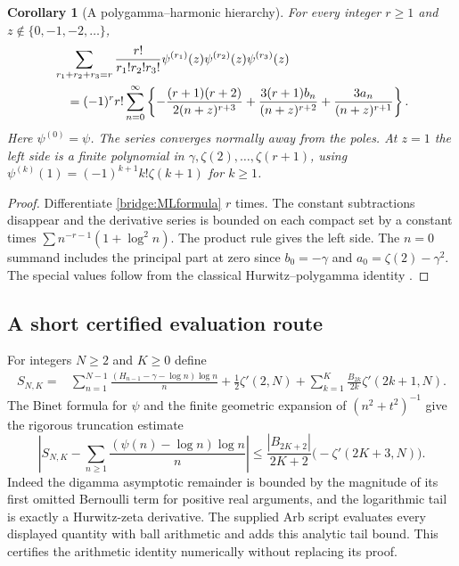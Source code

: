 \documentclass[11pt]{article}
\numberwithin{equation}{section}
\newtheorem{corollary}[theorem]{Corollary}
\theoremstyle{definition}
\theoremstyle{remark}
\begin{document}
\begin{corollary}[A polygamma--harmonic hierarchy]\label{bridge:polygamma}
For every integer $r\ge1$ and $z\notin\{0,-1,-2,\ldots\}$,
\begin{align}
 &\sum_{r_1+r_2+r_3=r}\frac{r!}{r_1!r_2!r_3!}
       \psi^{(r_1)}(z)\psi^{(r_2)}(z)\psi^{(r_3)}(z)\notag\\
 &\quad=(-1)^r r!\sum_{n=0}^{\infty}
   \left\{-\frac{(r+1)(r+2)}{2(n+z)^{r+3}}
       +\frac{3(r+1)b_n}{(n+z)^{r+2}}
       +\frac{3a_n}{(n+z)^{r+1}}\right\}.
 \label{bridge:allpolygamma}
\end{align}
Here $\psi^{(0)}=\psi$. The series converges normally away from
the poles. At $z=1$ the left side is a finite polynomial in
$\gamma,\zeta(2),\ldots,\zeta(r+1)$, using
$\psi^{(k)}(1)=(-1)^{k+1}k!\zeta(k+1)$ for $k\ge1$.
\end{corollary}
\begin{proof}
Differentiate \eqref{bridge:MLformula} $r$ times. The constant
subtractions disappear and the derivative series is bounded on each
compact set by a constant times
$\sum n^{-r-1}(1+\log^2n)$. The product rule gives the left
side. The $n=0$ summand includes the principal part at zero since
$b_0=-\gamma$ and $a_0=\zeta(2)-\gamma^2$. The special values
follow from the classical Hurwitz--polygamma identity
\cite[Section~25.11]{DLMFhurwitz}.
\end{proof}

\subsection{A short certified evaluation route}

For integers $N\ge2$ and $K\ge0$ define
\begin{align*}
 S_{N,K}={}&\sum_{n=1}^{N-1}
  \frac{(H_{n-1}-\gamma-\log n)\log n}{n}
   +\frac12\zeta'(2,N)
   +\sum_{k=1}^K\frac{B_{2k}}{2k}\zeta'(2k+1,N).
\end{align*}
The Binet formula for $\psi$ \cite[Section~5.9]{DLMFgamma} and the finite geometric expansion of
$(n^2+t^2)^{-1}$ give the rigorous truncation estimate
\begin{equation}\label{bridge:tail-bound}
 \left|S_{N,K}-\sum_{n\ge1}
  \frac{(\psi(n)-\log n)\log n}{n}\right|
 \le \frac{|B_{2K+2}|}{2K+2}\bigl(-\zeta'(2K+3,N)\bigr).
\end{equation}
Indeed the digamma asymptotic remainder is bounded by the magnitude of
its first omitted Bernoulli term for positive real arguments, and the
logarithmic tail is exactly a Hurwitz-zeta derivative.
The supplied Arb script evaluates every displayed quantity with ball
arithmetic and adds this analytic tail bound.  This certifies the
arithmetic identity numerically without replacing its proof.
\end{document}
